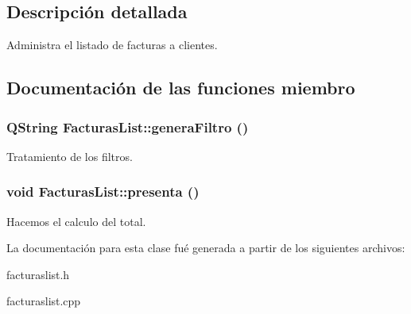 \subsection{Descripci\'{o}n detallada}
Administra el listado de facturas a clientes. 



\subsection{Documentaci\'{o}n de las funciones miembro}
\subsubsection{\setlength{\rightskip}{0pt plus 5cm}QString Facturas\-List::genera\-Filtro ()}\label{classFacturasList_a3}


Tratamiento de los filtros. 
\subsubsection{\setlength{\rightskip}{0pt plus 5cm}void Facturas\-List::presenta ()}\label{classFacturasList_a11}


Hacemos el calculo del total. 

La documentaci\'{o}n para esta clase fu\'{e} generada a partir de los siguientes archivos:\begin{CompactItemize}
\item 
facturaslist.h\item 
facturaslist.cpp\end{CompactItemize}
